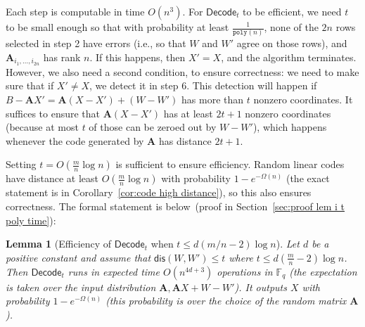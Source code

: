\documentclass[11pt]{article}
\newcommand{\secref}[1]{\mbox{Section~\ref{#1}}}
\newcommand{\corref}[1]{\mbox{Corollary~\ref{#1}}}
\newcommand{\lemref}[1]{\mbox{Lemma~\ref{#1}}}
\newcommand{\class}[1]{{\ensuremath{\mathsf{#1}}}}
\newcommand{\vect}[1]{\ensuremath{\textbf{#1}}}
\newcommand{\Fq}{\ensuremath{\mathbb{F}_q}}
\newcommand{\dis}{\ensuremath{\mathsf{dis}}}
\newcommand{\decode}{\ensuremath{\mathsf{Decode}}}
\newcommand{\poly}{\ensuremath{\mathtt{poly}}\xspace}
\newcommand{\distLWE}{\ensuremath{\class{dist\mbox{-}LWE}}}
\newtheorem{lemma}[theorem]{Lemma}
\newcommand{\authnote}[2]{{\textcolor{red}{\textsf{#1 notes: }\textcolor{blue}{ #2}}\marginpar{\textcolor{red}{\textbf{!!!!!}}}}}
\newcommand{\authnote}[2]{}
\newcommand{\lnote}[1]{{\authnote{Leo}{#1}}}
\newcommand{\vA}{\vect{A}}
\begin{document}
Each step is computable in time $O(n^3)$. 
For $\decode_t$ to be efficient, we need $t$ to be small enough so that  with probability at least $\frac{1}{\poly(n)}$, none of the $2n$ rows  selected  in step 2 have errors (i.e., so that $W$ and $W'$ agree on those rows), and $\vA_{i_1,...,i_{2n}}$ has rank  $n$.  If this happens, then $X'=X$, and the algorithm terminates.  However, we also need a second condition, to ensure correctness: we need to make sure that if $X'\neq X$, we detect it in step 6.  This detection will happen if $B-\vA X' = \vA (X-X')+(W-W')$ has more than $t$ nonzero coordinates.  It suffices to ensure that $\vA (X-X')$ has at least $2t+1$ nonzero coordinates (because at most $t$ of those can be zeroed out by $W-W'$), which happens whenever the code generated by $\vA$ has distance $2t+1$.

Setting $t = O(\frac{m}{n}\log n)$ is sufficient to ensure efficiency.    Random linear codes have distance at least $O(\frac{m}{n}\log n)$ with probability $1-e^{-\Omega(n)}$ (the exact statement is in \corref{cor:code high distance}), so this also ensures correctness.
The formal statement is below~(proof in \secref{sec:proof lem i t poly time}):
\begin{lemma}[Efficiency of $\decode_t$ when $t\leq d (m/n-2)\log n$]
\label{lem:i t poly time}
Let $d$ be a positive constant and assume that $\dis(W, W')\leq t$ where $t\leq d(\frac{m}{n}-2)\log n$.  Then $\decode_t$ runs in expected time $O(n^{4d+3})$ operations in $\Fq$ (the expectation is taken over the input distribution $\vA, \vA X+W - W'$).  It outputs $X$ with probability $1-e^{-\Omega(n)}$ (this probability is over the choice of the random matrix  $\vA$).
\end{lemma}
\end{document}
